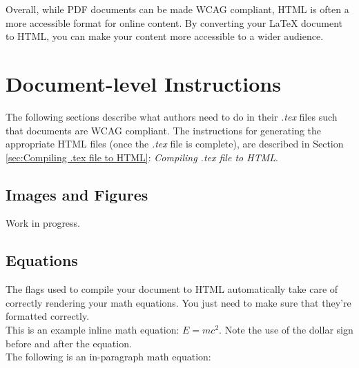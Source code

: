 \documentclass[lang=en]{article}
\begin{document}
Overall, while PDF documents can be made WCAG compliant, HTML is often a more
accessible format for online content. By converting your LaTeX document to
HTML, you can make your content more accessible to a wider audience.


\section{Document-level Instructions}

The following sections describe what authors need to do in their \textit{.tex}
files such that documents are WCAG compliant. The instructions for generating
the appropriate HTML files (once the \textit{.tex} file is complete), are
described in Section \ref{sec:Compiling .tex file to HTML}: \textit{Compiling
  .tex file to HTML}.


\subsection{Images and Figures}

Work in progress.





\subsection{Equations}

The flags used to compile your document to HTML automatically take care of
correctly rendering your math equations. You just need to make sure that they're
formatted correctly. \\

This is an example inline math equation: $E=mc^2$. Note the use of the dollar
sign before and after the equation. \\

The following is an in-paragraph math equation:
\end{document}
